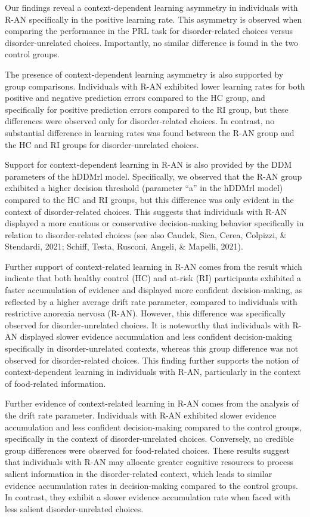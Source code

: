 \documentclass[
  man,floatsintext]{apa6}
\begin{document}
Our findings reveal a context-dependent learning asymmetry in individuals with R-AN specifically in the positive learning rate. This asymmetry is observed when comparing the performance in the PRL task for disorder-related choices versus disorder-unrelated choices. Importantly, no similar difference is found in the two control groups.

The presence of context-dependent learning asymmetry is also supported by group comparisons. Individuals with R-AN exhibited lower learning rates for both positive and negative prediction errors compared to the HC group, and specifically for positive prediction errors compared to the RI group, but these differences were observed only for disorder-related choices. In contrast, no substantial difference in learning rates was found between the R-AN group and the HC and RI groups for disorder-unrelated choices.

Support for context-dependent learning in R-AN is also provided by the DDM parameters of the hDDMrl model. Specifically, we observed that the R-AN group exhibited a higher decision threshold (parameter ``a'' in the hDDMrl model) compared to the HC and RI groups, but this difference was only evident in the context of disorder-related choices. This suggests that individuals with R-AN displayed a more cautious or conservative decision-making behavior specifically in relation to disorder-related choices (see also Caudek, Sica, Cerea, Colpizzi, \& Stendardi, 2021; Schiff, Testa, Rusconi, Angeli, \& Mapelli, 2021).

Further support of context-related learning in R-AN comes from the result which indicate that both healthy control (HC) and at-risk (RI) participants exhibited a faster accumulation of evidence and displayed more confident decision-making, as reflected by a higher average drift rate parameter, compared to individuals with restrictive anorexia nervosa (R-AN). However, this difference was specifically observed for disorder-unrelated choices. It is noteworthy that individuals with R-AN displayed slower evidence accumulation and less confident decision-making specifically in disorder-unrelated contexts, whereas this group difference was not observed for disorder-related choices. This finding further supports the notion of context-dependent learning in individuals with R-AN, particularly in the context of food-related information.

Further evidence of context-related learning in R-AN comes from the analysis of the drift rate parameter. Individuals with R-AN exhibited slower evidence accumulation and less confident decision-making compared to the control groups, specifically in the context of disorder-unrelated choices. Conversely, no credible group differences were observed for food-related choices. These results suggest that individuals with R-AN may allocate greater cognitive resources to process salient information in the disorder-related context, which leads to similar evidence accumulation rates in decision-making compared to the control groups. In contrast, they exhibit a slower evidence accumulation rate when faced with less salient disorder-unrelated choices.
\end{document}
